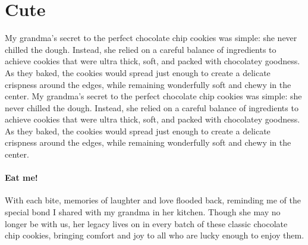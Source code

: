 \section{Cute}

My grandma's secret to the perfect chocolate chip cookies was simple: she never chilled the dough. Instead, she relied on a careful balance of ingredients to achieve cookies that were ultra thick, soft, and packed with chocolatey goodness. As they baked, the cookies would spread just enough to create a delicate crispness around the edges, while remaining wonderfully soft and chewy in the center.
My grandma's secret to the perfect chocolate chip cookies was simple: she never chilled the dough. Instead, she relied on a careful balance of ingredients to achieve cookies that were ultra thick, soft, and packed with chocolatey goodness. As they baked, the cookies would spread just enough to create a delicate crispness around the edges, while remaining wonderfully soft and chewy in the center.

\paragraph{Eat me!}

With each bite, memories of laughter and love flooded back, reminding me of the special bond I shared with my grandma in her kitchen. Though she may no longer be with us, her legacy lives on in every batch of these classic chocolate chip cookies, bringing comfort and joy to all who are lucky enough to enjoy them.

\bigskip

